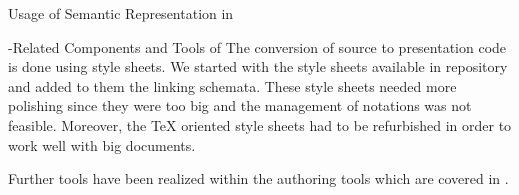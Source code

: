 \begin{omgroup}[id=activemath,short=ActiveMath,
  creators={melis,goguadse,alberto,frischauf,homik,libbrecht,cullrich}]
\begin{omgroup}{Usage of Semantic Representation in {\activemath}}
\begin{omgroup}{{\omdoc}-Related Components and Tools of {\activemath}}
The conversion of {\omdoc} source to presentation code is done using {\xslt} style sheets. 
We started with the style sheets available in {\omdoc} repository and added to them the
{\activemath} linking schemata.
These style sheets needed more polishing since they were too big and the management of
notations was not feasible.  Moreover, the {\TeX} oriented style sheets had to be
refurbished in order to work well with big documents.

Further tools have been realized within the authoring tools which are covered in
{}.
\end{omgroup}
\end{omgroup}
\end{omgroup}


